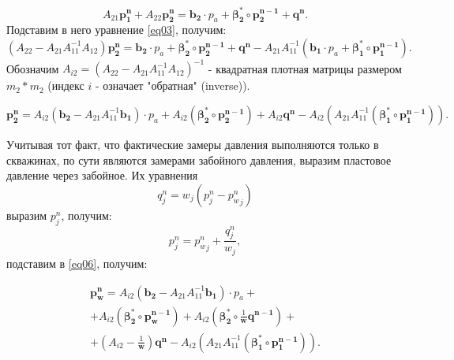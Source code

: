 \documentclass[14pt]{article}
\begin{document}
\begin{equation*} \label{eq04}
	A_{21} \mathbf { p_1^n } + A_{22} \mathbf {p_2^n} =\mathbf{b_2} \cdot p_a +
	\boldsymbol{\beta_2^*} \circ  \mathbf {p_2^{n-1}} + \mathbf{q^n}.
\end{equation*}
Подставим в него уравнение \ref{eq03}, получим:
\begin{equation*} \label{eq05}
	(A_{22} - A_{21} A_{11}^{-1} A_{12})\mathbf {p_2^n} = \mathbf{b_2} \cdot p_a +
	\boldsymbol{\beta_2^*} \circ  \mathbf {p_2^{n-1}} + \mathbf{q^n} - A_{21} A_{11}^{-1}\left(\mathbf{b_1} \cdot p_a +
	\boldsymbol{\beta_1^*} \circ  \mathbf {p_1^{n-1}} \right).
\end{equation*}
Обозначим $A_{i2} = (A_{22} - A_{21} A_{11}^{-1} A_{12})^{-1}$ - квадратная плотная матрицы размером $m_2*m_2$ (индекс $i$ - означает "обратная" (inverse)).

\begin{equation} \label{eq06}
	\mathbf {p_2^n} = A_{i2} (\mathbf{b_2} -A_{21} A_{11}^{-1} \mathbf{b_1})\cdot p_a +
	A_{i2} \left(\boldsymbol{\beta_2^*} \circ  \mathbf {p_2^{n-1}}\right) + A_{i2} \mathbf{q^n}
	- 	A_{i2} \left(A_{21} A_{11}^{-1} \left(\boldsymbol{\beta_1^*} \circ  \mathbf {p_1^{n-1}}\right)\right).
\end{equation}

Учитывая тот факт, что фактические замеры давления выполняются только в скважинах, по сути являются замерами забойного давления, выразим пластовое давление через забойное. Их уравнения 
\begin{equation*} \label{eq07}
q_j^n = w_j\left(p_j^n - {p^n_w}_j \right)
\end{equation*}
выразим $p_j^n$, получим:
\begin{equation*} \label{eq08}
p_j^n = {p^n_w}_j + \frac{q_j^n}{w_j},
\end{equation*}
подставим в \ref{eq06}, получим:

\begin{eqnarray} \label{eq09}
	\mathbf {p_w^n} = A_{i2} (\mathbf{b_2} -A_{21} A_{11}^{-1} \mathbf{b_1})\cdot p_a + \nonumber \\ 
	+ A_{i2} \left(\boldsymbol{\beta_2^*} \circ  \mathbf {p_w^{n-1}}\right)
	+ A_{i2} \left(\boldsymbol{\beta_2^*} \circ   \frac{1}{\mathbf{w}} \mathbf{q^{n-1}} \right)+  \nonumber \\ 
	+ \left(A_{i2} -  \frac{1}{\mathbf{w}}\right) \mathbf{q^n}
	- 	A_{i2} \left(A_{21} A_{11}^{-1} \left(\boldsymbol{\beta_1^*} \circ  \mathbf {p_1^{n-1}}\right)\right).
\end{eqnarray}
\end{document}
